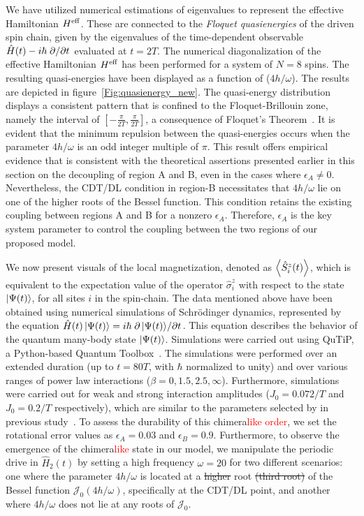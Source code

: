 \documentclass[12pt]{iopart}
\newcommand{\red}[1]{\textcolor{red}{#1}}
\begin{document}
We have utilized numerical estimations of eigenvalues to represent the effective Hamiltonian $H^{\rm eff}$. These are connected to the \textit{ Floquet quasienergies} of the driven spin chain, given by the eigenvalues of the time-dependent observable $\hat{H}(t)-i\hbar\pdv*{}{t}$ evaluated at $t=2T$. The numerical diagonalization of the effective Hamiltonian $H^{\rm eff}$ has been performed for a system of $N=8$ spins. The resulting quasi-energies have been displayed as a function of ($4h/\omega$). The results are depicted in figure~\ref{Fig:quasienergy_new}. The quasi-energy distribution displays a consistent pattern that is confined to the Floquet-Brillouin zone, namely the interval of $[-\frac{\pi}{2T}, \frac{\pi}{2T}]$, a consequence of Floquet's Theorem~\cite{dutta2014}. It is evident that the minimum repulsion between the quasi-energies occurs when the parameter $4h/\omega$ is an odd integer multiple of $\pi$. This result offers empirical evidence that is consistent with the theoretical assertions presented earlier in this section on the decoupling of region A and B, even in the cases where $\epsilon_A \neq 0$. Nevertheless, the CDT/DL condition in region-B necessitates that $4h/\omega$ lie on one of the higher roots of the Bessel function. This condition retains the existing coupling between regions A and B for a nonzero $\epsilon_A$. Therefore, $\epsilon_A$ is the key system parameter to control the coupling between the two regions of our proposed model. 	
	
We now present visuals of the local magnetization, denoted as $\expval{\hat{S}^z_i (t)}$, which is equivalent to the expectation value of the operator $\hat{\sigma}^z_i$ with respect to the state $\ket{\Psi(t)}$, for all sites $i$ in the spin-chain. The data mentioned above have been obtained using numerical simulations of Schr\"odinger dynamics, represented by the equation $\hat{H}(t)\ket{\Psi(t)}= i \hbar \pdv*{\ket{\Psi(t)}}{t}$. This equation describes the behavior of the quantum many-body state $\ket{\Psi(t)}$. Simulations were carried out using QuTiP, a Python-based Quantum Toolbox~\cite{Johansson2013}. The simulations were performed over an extended duration (up to $t = 80T$, with $\hbar$ normalized to unity) and over various ranges of power law interactions ($\beta = 0,1.5,2.5,\infty$). Furthermore, simulations were carried out for weak and strong interaction amplitudes ($J_0 = 0.072/T$ and $J_0 = 0.2/T$ respectively), which are similar to the parameters selected by in previous study~\cite{sakurai_phys_nodate,zhang_observation_2017}. To assess the durability of this chimera\red{like order}, we set the rotational error values as $\epsilon_A = 0.03$ and $\epsilon_B = 0.9$. Furthermore, to observe the emergence of the chimera\red{like} state in our model, we manipulate the periodic drive in $\hat{H}_2(t)$ by setting a high frequency $\omega=20$ for two different scenarios: one where the parameter $4h/\omega$ is located at a \sout{higher} root \sout{(third root)} of the Bessel function $\mathcal{J}_0(4h/\omega)$, specifically at the CDT/DL point, and another where $4h/\omega$  does not lie at any roots of $\mathcal{J}_0$.
	
\end{document}
